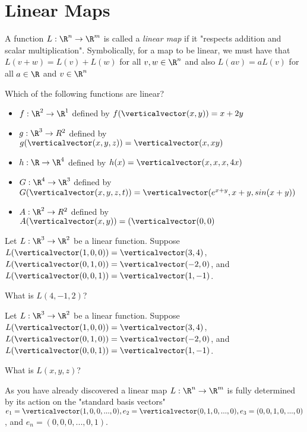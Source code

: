 
\section{Linear Maps}

\begin{definition}
	A function $L: \R^n \to \R^m$ is called a \textit{linear map} if it "respects addition and scalar multiplication".
	Symbolically, for a map to be linear, we must have that $L(v+w) = L(v)+L(w)$ for all $v,w \in \R^n$ and also
	$L(av) = a L(v)$ for all $a \in \R$ and $v\in \R^n$
\end{definition}

	\begin{question}
		Which of the following functions are linear?
		\begin{itemize}
			\item $f: \R^2 \to \R^1$ defined by $f(\verticalvector(x,y)) = x+2y$
			\item $g: \R^3 \to R^2$ defined by $g(\verticalvector(x,y,z)) = \verticalvector(x,xy)$
			\item $h:\R \to \R^4$ defined by $h(x) = \verticalvector(x,x,x,4x)$
			\item $G: \R^4 \to  \R^3$ defined by $G(\verticalvector(x,y,z,t)) = \verticalvector(e^{x+y},x+y,sin(x+y))$
			\item $A: \R^2 \to R^2$ defined by $A(\verticalvector(x,y))=(\verticalvector(0,0)$
		\end{itemize}
	\end{question}
	
	\begin{question}
	 	Let $L:\R^3 \to \R^2$ be a linear function.  Suppose $L(\verticalvector(1,0,0)) = \verticalvector(3,4)$, 
	 	 $L(\verticalvector(0,1,0)) = \verticalvector(-2,0)$,  and  $L(\verticalvector(0,0,1)) = \verticalvector(1,-1)$.
	 	 
	 	What is $L(4,-1,2)$?
	\end{question}
	
	\begin{question}
	 	Let $L:\R^3 \to \R^2$ be a linear function.  Suppose $L(\verticalvector(1,0,0)) = \verticalvector(3,4)$, 
	 	 $L(\verticalvector(0,1,0)) = \verticalvector(-2,0)$,  and  $L(\verticalvector(0,0,1)) = \verticalvector(1,-1)$.
	 	 
	 	What is $L(x,y,z)$?
	\end{question}
	
	As you have already discovered a linear map $L: \R^n \to \R^m$  is fully determined by
	its action on the "standard basis vectors" $e_1 = \verticalvector(1,0,0,...,0), e_2 = \verticalvector(0,1,0,...,0), e_3 = (0,0,1,0,...,0)$, and $e_n = (0,0,0,...,0,1)$.
	

